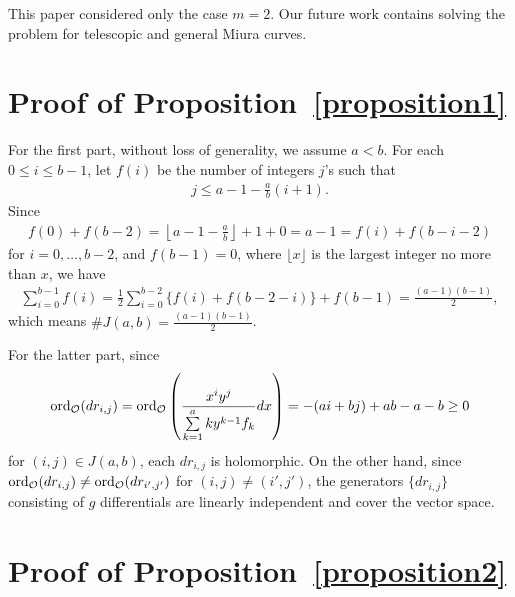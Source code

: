 \documentclass[pdftex]{sigma}
\numberwithin{equation}{section}
\theoremstyle{definition}
\begin{document}
This paper considered only the case $m=2$. Our future work contains solving the problem for telescopic and general Miura curves.

\appendix
\section{Proof of Proposition~\ref{proposition1}}
For the f\/irst part, without loss of generality, we assume $a<b$. For each $0\leq i\leq b-1$, let $f(i)$ be the number of integers $j$'s such that
\begin{gather*}j\leq a-1-\frac{a}{b}(i+1).\end{gather*}
Since
\begin{gather*}f(0)+f(b-2)=\left\lfloor a-1-\frac{a}{b}\right\rfloor +1+0=a-1=f(i)+f(b-i-2)\end{gather*}
for $i=0,\dots,b-2$, and $f(b-1)=0$, where $\lfloor x\rfloor$ is the largest integer no more than $x$, we have
\begin{gather*}\sum_{i=0}^{b-1}f(i)=\frac{1}{2}\sum_{i=0}^{b-2}\{f(i)+f(b-2-i)\}+f(b-1)=\frac{(a-1)(b-1)}{2},\end{gather*}
which means $ \#J(a,b)=\frac{(a-1)(b-1)}{2}$.

For the latter part, since
\begin{gather*}\operatorname{ord}_{\cal O}(dr_{i,j})=\operatorname{ord}_{\cal O}\left(\frac{x^iy^j}{\sum\limits_{k=1}^aky^{k-1}f_k}dx\right)=-(ai+bj)+ab-a-b\geq 0\end{gather*}
for $(i,j)\in J(a,b)$, each $dr_{i,j}$ is holomorphic. On the other hand, since $\operatorname{ord}_{\cal O}(dr_{i,j})\not=\operatorname{ord}_{\cal O}(dr_{i',j'})$ for $(i,j)\not=(i',j')$, the generators $\{dr_{i,j}\}$ consisting of $g$ dif\/ferentials are linearly independent and cover the vector space.

\section{Proof of Proposition~\ref{proposition2}}
\end{document}

